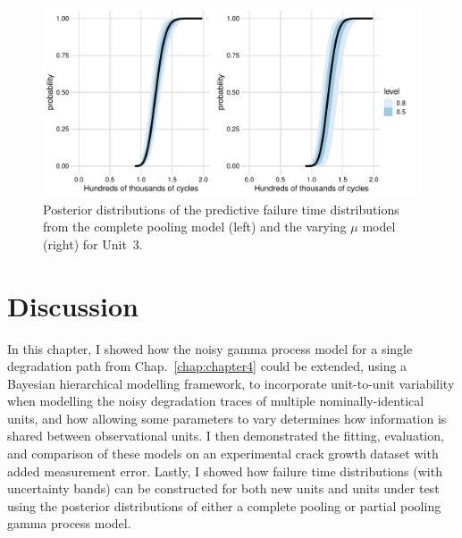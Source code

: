 \begin{figure}[h]
    \centering
    \includegraphics[width=0.95\columnwidth]{./figures/ch-5/FT_dist_Unit3.pdf}
    \caption{Posterior distributions of the predictive failure time distributions from the complete pooling model (left) and the varying $\mu$ model (right) for Unit~3.}
    \label{fig:FT_CP_VM_U3}
\end{figure}

\section{Discussion} \label{sec:unit-to-unit-discussion}

In this chapter, I showed how the noisy gamma process model for a single degradation path from Chap.~\ref{chap:chapter4} could be extended, using a Bayesian hierarchical modelling framework, to incorporate unit-to-unit variability when modelling the noisy degradation traces of multiple nominally-identical units, and how allowing some parameters to vary determines how information is shared between observational units. I then demonstrated the fitting, evaluation, and comparison of these models on an experimental crack growth dataset with added measurement error. Lastly, I showed how failure time distributions (with uncertainty bands) can be constructed for both new units and units under test using the posterior distributions of either a complete pooling or partial pooling gamma process model.

